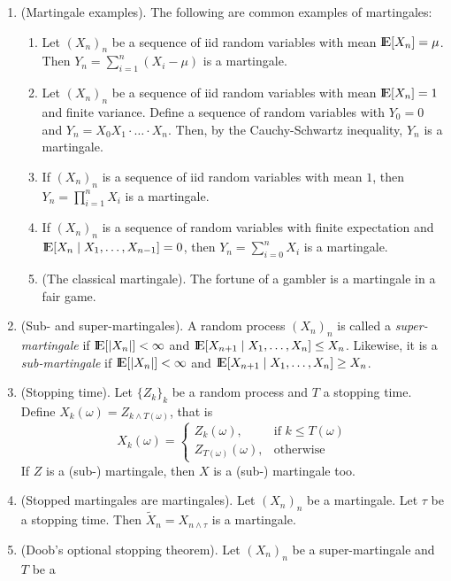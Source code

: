 \documentclass[a4paper,10pt]{scrbook}
\begin{document}
\begin{enumerate}
 \item (Martingale examples). The following are common examples of martingales:
  \begin{enumerate}
   \item Let $(X_n)_n$ be a sequence of iid random variables with mean $\E[X_n]=\mu$. Then
         $Y_n = \sum_{i=1}^{n}(X_i-\mu)$ is a martingale.
   \item Let $(X_n)_n$ be a sequence of iid random variables with mean $\E[X_n]=1$ and finite
         variance. Define a sequence of random variables with \(Y_0=0\) and 
         \(Y_n = X_0 X_1 \cdot \ldots \cdot X_n\). Then, by the Cauchy-Schwartz inequality,
         \(Y_n\) is a martingale.
   \item If $(X_n)_n$ is a sequence of iid random variables with mean $1$, then 
         $Y_n = \prod_{i=1}^{n}X_i$ is a martingale.
   \item If $(X_n)_n$ is a sequence of random variables with finite expectation and 
         $\E[X_n{}\mid{}X_1,\ldots,X_{n-1}]=0$, then $Y_n=\sum_{i=0}^{n}X_i$ is a 
         martingale.
   \item (The classical martingale). The fortune of a gambler is a martingale in a fair game.
  \end{enumerate}
 \item (Sub- and super-martingales). A random process $(X_n)_n$ is called a \textit{super-martingale} if 
		     $\E[|X_n|]<\infty$ and $\E[X_{n+1}{}\mid{}X_1,\ldots, X_n]\leq X_{n}$. Likewise, it 
		     is a \textit{sub-martingale} if $\E[|X_n|]<\infty$ and $\E[X_{n+1}{}\mid{}X_1,\ldots, X_n]\geq X_{n}$.
 \item \label{it:stopping_time}
       (Stopping time). Let $\{Z_k\}_k$ be a random process and $T$ a stopping time. 
       Define $X_k(\omega) = Z_{k\wedge T(\omega)}$, that is
       \[
        X_k(\omega) = \begin{cases}
                       Z_k(\omega),&\text{if }k \leq T(\omega)\\
                       Z_{T(\omega)}(\omega),&\text{otherwise}
                      \end{cases}
       \]
       If $Z$ is a (sub-) martingale, then $X$ is a (sub-) martingale too.
 \item (Stopped martingales are martingales). Let \((X_n)_n\) be a martingale. 
       Let $\tau$ be a stopping time. Then $\tilde{X}_n = X_{n \wedge \tau}$
       is a martingale. 
 \item (Doob's optional stopping theorem). Let \((X_n)_n\) be a super-martingale and \(T\) be a 

\end{enumerate}
\end{document}

